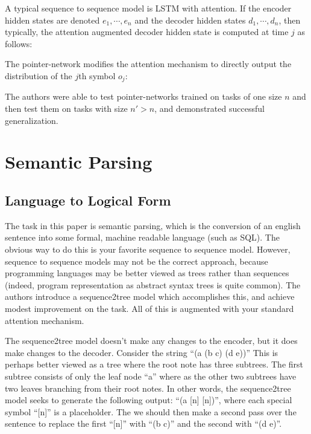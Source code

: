 \documentclass[12pt]{article}
\begin{document}
A typical sequence to sequence model is LSTM with attention. If the encoder hidden states are denoted $e_1, \cdots, e_n$ and the decoder hidden states $d_1, \cdots, d_n$, then typically, the attention augmented decoder hidden state is computed at time $j$ as follows:


The pointer-network modifies the attention mechanism to directly output the distribution of the $j$th symbol $o_j$:



The authors were able to test pointer-networks trained on tasks of one size $n$ and then test them on tasks with size $n' > n$, and demonstrated successful generalization.

\section{Semantic Parsing}

\subsection{Language to Logical Form \cite{Language2LogicalForm}}

The task in this paper is semantic parsing, which is the conversion of an english sentence into some formal, machine readable language (such as SQL). The obvious way to do this is your favorite sequence to sequence model. However, sequence to sequence models may not be the correct approach, because programming languages may be better viewed as trees rather than sequences (indeed, program representation as abstract syntax trees is quite common). The authors introduce a sequence2tree model which accomplishes this, and achieve modest improvement on the task. All of this is augmented with your standard attention mechanism. 

The sequence2tree model doesn't make any changes to the encoder, but it does make changes to the decoder. Consider the string ``(a (b c) (d e))'' This is perhaps better viewed as a tree where the root note has three subtrees. The first subtree consists of only the leaf node ``a'' where as the other two subtrees have two leaves branching from their root notes. In other words, the sequence2tree model seeks to generate the following output: ``(a [n] [n])'', where each special symbol ``[n]'' is a placeholder. The we should then make a second pass over the sentence to replace the first ``[n]'' with ``(b c)'' and the second with ``(d e)''.
\end{document}
